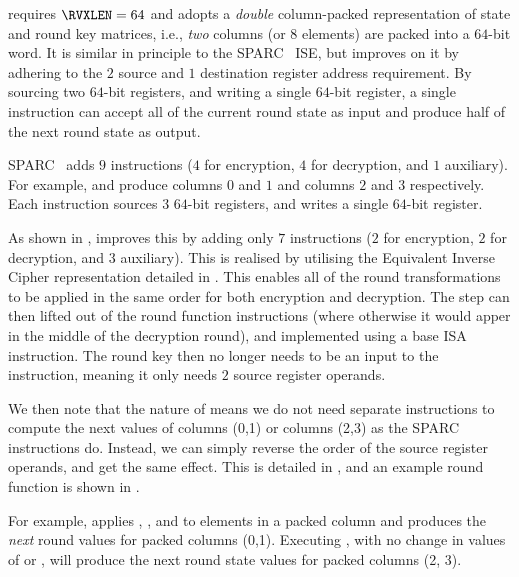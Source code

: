 
 requires $\RVXLEN = 64$
and adopts a {\em double} column-packed 
representation of state and round key matrices,
i.e., {\em two} columns (or $8$ elements) are packed into a $64$-bit word.
It is similar in principle to the SPARC~\cite[Page 109]{SPARC:16} ISE,
but improves on it by adhering to the
$2$ source and $1$ destination register address requirement.
By sourcing two $64$-bit registers, and writing a single $64$-bit register,
a single instruction can 
accept  all  of the current round state as  input
and
produce half of the next    round state as output.

SPARC~\cite[Page 109]{SPARC:16} adds $ 9$
instructions ($4$ for encryption, $4$ for decryption, and $1$ auxiliary).
For example,  and 
produce columns $0$ and $1$ and columns $2$ and $3$
respectively.
Each instruction sources $3$ $64$-bit registers, and writes a single
$64$-bit register.

As shown in ,  improves this by 
adding only $ 7$
instructions ($2$ for encryption, $2$ for decryption, and $3$ auxiliary).
This is realised by utilising the Equivalent Inverse Cipher representation
detailed in \cite[Section 5.3.5]{FIPS:197}.
This enables all of the round transformations to be applied in the same
order for both encryption and decryption.
The  step can then lifted out of the
round function instructions (where otherwise it would apper in the middle of
the decryption round), and implemented using a base ISA 
instruction.
The round key then no longer needs to be an input to the instruction,
meaning it only needs $2$ source register operands.

We then note that the nature of  means we do
not need separate instructions to compute the next values of
columns (0,1) or columns (2,3) as the SPARC instructions do.
Instead, we can simply reverse the order of the source register
operands, and get the same effect.
This is detailed in , and an example round
function is shown in .

For example,
applies
, , and   
to elements in a packed column and
produces the {\em next} round values for packed columns (0,1).
Executing
, with no change in values of
 or , will produce the next round state values for
packed columns (2, 3).


